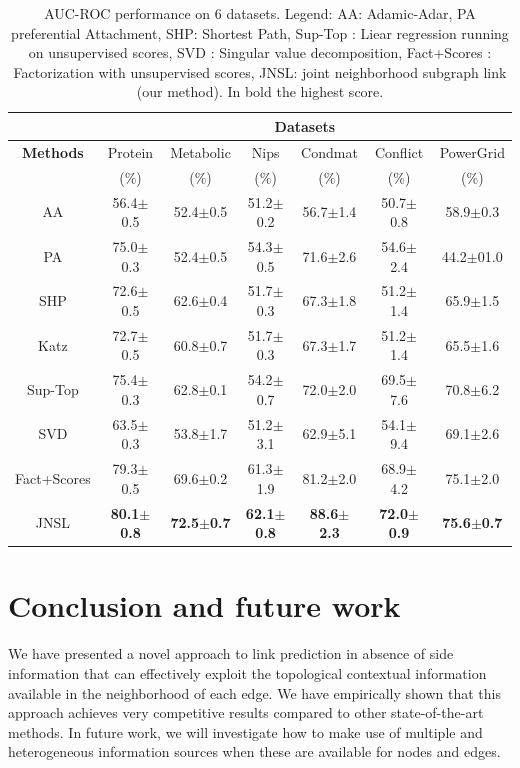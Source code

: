 \documentclass[runningheads,a4paper]{llncs}
\begin{document}
\begin{table}
\caption{AUC-ROC performance on 6 datasets. Legend: AA: Adamic-Adar, PA \cite{pa} preferential Attachment, SHP: Shortest Path, Sup-Top \cite{matrix-factorization}: Liear regression running on unsupervised scores, SVD \cite{matrix-factorization}: Singular value decomposition, Fact+Scores \cite{matrix-factorization}: Factorization with unsupervised scores, JNSL: joint neighborhood subgraph link (our method). In bold the highest score.}
\centering
\setlength{\tabcolsep}{1mm}
\begin{tabular}{|c|c|c|c|c|c|c|}

\hline
         & \multicolumn{6}{c|}{\textbf{Datasets}}\\
 \hline
\textbf{Methods} & Protein & Metabolic & Nips & Condmat & Conflict & PowerGrid\\
	& ($\%$) & ($\%$) & ($\%$) & ($\%$) & ($\%$) & ($\%$)\\
\hline
AA & 56.4$\pm$0.5 & 52.4$\pm$0.5 & 51.2$\pm$0.2 & 56.7$\pm$1.4 & 50.7$\pm$0.8 & 58.9$\pm$0.3\\
PA & 75.0$\pm$0.3 & 52.4$\pm$0.5 & 54.3$\pm$0.5 & 71.6$\pm$2.6 & 54.6$\pm$2.4 & 44.2$\pm$01.0\\
SHP & 72.6$\pm$0.5 & 62.6$\pm$0.4 & 51.7$\pm$0.3 & 67.3$\pm$1.8 & 51.2$\pm$1.4 & 65.9$\pm$1.5\\
Katz & 72.7$\pm$0.5 & 60.8$\pm$0.7 & 51.7$\pm$0.3 & 67.3$\pm$1.7 & 51.2$\pm$1.4 & 65.5$\pm$1.6 \\
Sup-Top & 75.4$\pm$0.3 & 62.8$\pm$0.1 & 54.2$\pm$0.7 & 72.0$\pm$2.0 & 69.5$\pm$7.6 & 70.8$\pm$6.2\\
SVD & 63.5$\pm$0.3 & 53.8$\pm$1.7 & 51.2$\pm$3.1 & 62.9$\pm$5.1 & 54.1$\pm$9.4 & 69.1$\pm$2.6\\
Fact+Scores & 79.3$\pm$0.5 & 69.6$\pm$0.2 & 61.3$\pm$1.9 & 81.2$\pm$2.0 & 68.9$\pm$4.2 & 75.1$\pm$2.0 \\
JNSL & \textbf{80.1$\pm$0.8} & \textbf{72.5$\pm$0.7} & \textbf{62.1$\pm$0.8} & \textbf{88.6$\pm$2.3} & \textbf{72.0$\pm$0.9} & \textbf{75.6$\pm$0.7} \\
 \hline 
\end{tabular}
\label{result_table}
\end{table}

\section{Conclusion and future work}
We have presented a novel approach to link prediction in absence of side information that can effectively exploit the topological contextual information available in the neighborhood of each edge. We have empirically shown that this approach achieves very competitive results compared to other state-of-the-art methods.
In future work, we will investigate how to make use of multiple and heterogeneous information sources when these are available for nodes and edges.
\end{document}
